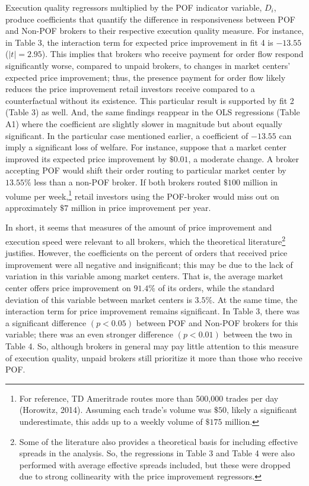 \documentclass[12pt,a4paper]{article}
\begin{document}
Execution quality regressors multiplied by the POF indicator variable, $D_i$, produce coefficients that quantify the difference in responsiveness between POF and Non-POF brokers to their respective execution quality measure. For instance, in Table 3, the interaction term for expected price improvement in fit 4 is $-13.55$ ($|t| = 2.95$). This implies that brokers who receive payment for order flow respond significantly worse, compared to unpaid brokers, to changes in market centers' expected price improvement; thus, the presence payment for order flow likely reduces the price improvement retail investors receive compared to a counterfactual without its existence. This particular result is supported by fit 2 (Table 3) as well. And, the same findings reappear in the OLS regressions (Table A1) where the coefficient are slightly slower in magnitude but about equally significant. In the particular case mentioned earlier, a coefficient of $-13.55$ can imply a significant loss of welfare. For instance, suppose that a market center improved its expected price improvement by $\$0.01$, a moderate change. A broker accepting POF would shift their order routing to particular market center by $13.55\%$ less than a non-POF broker. If both brokers routed $\$100$ million in volume per week,\footnote{For reference, TD Ameritrade routes more than 500,000 trades per day (Horowitz, 2014). Assuming each trade's volume was $\$50$, likely a significant underestimate, this adds up to a weekly volume of $\$175$ million.}  retail investors using the POF-broker would miss out on approximately $\$7$ million in price improvement per year.


In short, it seems that measures of the amount of price improvement and execution speed were relevant to all brokers, which the theoretical literature\footnote{ Some of the literature also provides a theoretical basis for including effective spreads in the analysis. So, the regressions in Table 3 and Table 4 were also performed with average effective spreads included, but these were dropped due to strong collinearity with the price improvement regressors.}  justifies. However, the coefficients on the percent of orders that received price improvement were all negative and insignificant; this may be due to the lack of variation in this variable among market centers. That is, the average market center offers price improvement on $91.4\%$ of its orders, while the standard deviation of this variable between market centers is $3.5\%$. At the same time, the interaction term for price improvement remains significant. In Table 3, there was a significant difference $(p < 0.05)$ between POF and Non-POF brokers for this variable; there was an even stronger difference $(p < 0.01)$  between the two in Table 4. So, although brokers in general may pay little attention to this measure of execution quality, unpaid brokers still prioritize it more than those who receive POF. 
\end{document}
